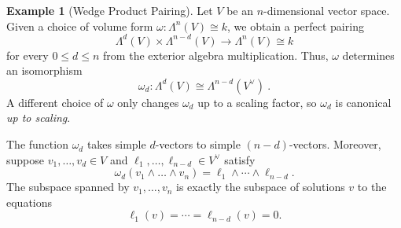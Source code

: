 \documentclass[12pt]{article}
\theoremstyle{plain}
\theoremstyle{definition}
\newtheorem{example}[theorem]{Example}
\theoremstyle{remark}
\numberwithin{equation}{section}
\begin{document}
\begin{example}[Wedge Product Pairing]
Let $V$ be an $n$-dimensional vector space.
Given a choice of volume form $\omega : \Lambda^n(V) \cong k$,
we obtain a perfect pairing
\[
\Lambda^d(V) \times \Lambda^{n-d}(V) \to
\Lambda^n(V) \cong k
\]
for every $0 \le d \le n$ from the exterior algebra multiplication.
Thus, $\omega$ determines an isomorphism
\[
\omega_d : \Lambda^d(V) \cong \Lambda^{n-d}(V^\vee) \ .
\]
A different choice of $\omega$ only changes $\omega_d$ up to a scaling
factor, so $\omega_d$ is canonical \emph{up to scaling}.

The function $\omega_d$ takes simple $d$-vectors to simple
$(n-d)$-vectors.  Moreover, suppose $v_1,\ldots,v_d \in V$
and $\ell_1,\ldots,\ell_{n-d} \in V^\vee$ satisfy
\[
\omega_d(v_1 \wedge \ldots \wedge v_n) = \ell_1 \wedge \cdots \wedge
\ell_{n-d} .
\]
The subspace spanned by $v_1,\ldots,v_n$ is exactly the subspace
of solutions $v$ to the equations
\[
\ell_1(v)=\cdots=\ell_{n-d}(v)=0 .
\]
\end{example}




\end{document}

